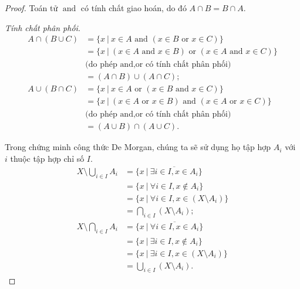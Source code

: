 \begin{proof}
    Toán tử  $\operatorname{and}$ có tính chất giao hoán, do đó $A\cap B = B\cap A$.

    \bigskip

    \textit{Tính chất phân phối}.
    \begin{align*}
        A\cap (B\cup C) & = \{ x\ |\ x\in A \text{ and } (x\in B \text{ or } x\in C) \}                       \\
                        & = \{ x\ |\ (x\in A \text{ and } x\in B) \text{ or } (x\in A \text{ and } x\in C) \} \\
                        & \text{(do phép $\text{and}, \text{or}$ có tính chất phân phối)}                     \\
                        & = (A\cap B)\cup (A\cap C); \\
        A\cup (B\cap C) & = \{ x\ |\ x\in A \text{ or } (x\in B \text{ and } x\in C) \}                      \\
                        & = \{ x\ |\ (x\in A \text{ or } x\in B) \text{ and } (x\in A \text{ or } x\in C) \} \\
                        & \text{(do phép $\text{and}, \text{or}$ có tính chất phân phối)}                    \\
                        & = (A\cup B)\cap (A\cup C).
    \end{align*}

    Trong chứng minh công thức De Morgan, chúng ta sẽ sử dụng họ tập hợp $A_{i}$ với $i$ thuộc tập hợp chỉ số $I$.
    \begin{align*}
        X\setminus\bigcup_{i\in I} A_{i} & = \{ x\ |\ \overline{\exists i\in I, x\in A_{i}} \}   \\
                                         & = \{ x\ |\ \forall i\in I, x\not\in A_{i} \}          \\
                                         & = \{ x\ |\ \forall i\in I, x\in (X\setminus A_{i}) \} \\
                                         & = \bigcap_{i\in I}(X\setminus A_{i}); \\
        X\setminus\bigcap_{i\in I} A_{i} & = \{ x\ |\ \overline{\forall i\in I, x\in A_{i}} \}   \\
                                         & = \{ x\ |\ \exists i\in I, x\not\in A_{i} \}          \\
                                         & = \{ x\ |\ \exists i\in I, x\in (X\setminus A_{i}) \} \\
                                         & = \bigcup_{i\in I}(X\setminus A_{i}).
    \end{align*}
\end{proof}

